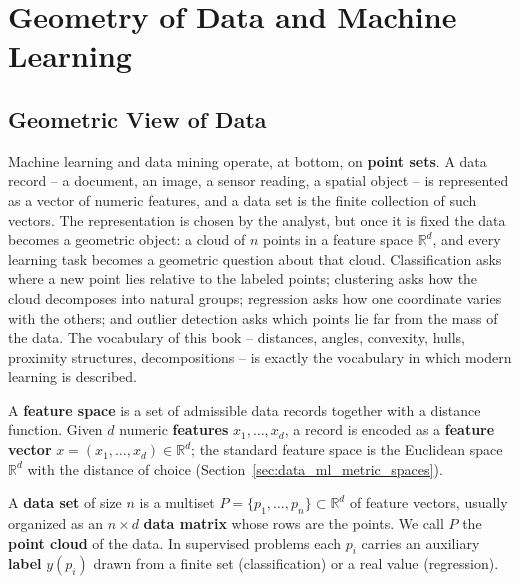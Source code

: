 \chapter{Geometry of Data and Machine Learning}
\label{ch:geometry_data_ml}

\section{Geometric View of Data}
\label{sec:data_ml_geometric_view}

Machine learning and data mining operate, at bottom, on \textbf{point
sets}. A data record -- a document, an image, a sensor
reading, a spatial object -- is represented as a vector of numeric features,
and a data set is the finite collection of such vectors. The representation
is chosen by the analyst, but once it is fixed the data becomes a geometric
object: a cloud of $n$ points in a feature space $\mathbb{R}^d$, and every
learning task becomes a geometric question about that cloud. Classification
asks where a new point lies relative to the labeled points; clustering asks
how the cloud decomposes into natural groups; regression asks how one
coordinate varies with the others; and outlier detection asks which points
lie far from the mass of the data. The vocabulary of this book -- distances,
angles, convexity, hulls, proximity structures, decompositions -- is exactly
the vocabulary in which modern learning is described.

\begin{definition}\label{def:data_ml_feature}
  A \textbf{feature space} is a set of admissible data
  records together with a distance function. Given $d$ numeric
  \textbf{features} $x_1, \dots, x_d$, a record is encoded as
  a \textbf{feature vector} $x = (x_1, \dots, x_d) \in \mathbb{R}^d$; the
  standard feature space is the Euclidean space $\mathbb{R}^d$ with the
  distance of choice (Section~\ref{sec:data_ml_metric_spaces}).
\end{definition}

\begin{definition}\label{def:data_ml_pointcloud}
  A \textbf{data set} of size $n$ is a multiset
  $P = \{p_1, \dots, p_n\} \subset \mathbb{R}^d$ of feature vectors, usually
  organized as an $n \times d$ \textbf{data matrix} whose rows are the
  points. We call $P$ the \textbf{point cloud} of the
  data. In supervised problems each $p_i$ carries an auxiliary
  \textbf{label} $y(p_i)$ drawn from a finite set (classification) or a
  real value (regression).
\end{definition}

